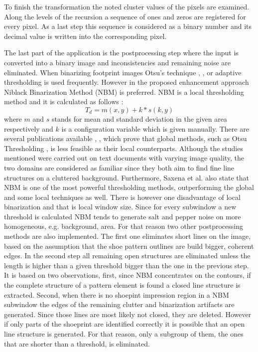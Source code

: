 \documentclass[draft,final]{vutinfth} %
\begin{document}
To finish the transformation the noted cluster values of the pixels are examined.
Along the levels of the recursion a sequence of ones and zeros are registered for every pixel.
As a last step this sequence is considered as a binary number and its decimal value is written into the corresponding pixel.
\par
The last part of the application is the postprocessing step where the input is converted into a binary image and inconsistencies and remaining noise are eliminated.
When binarizing footprint images Otsu's technique \cite{algarni2008novel}, \cite{alizadeh2017automatic}, \cite{wu2019crime} or adaptive thresholding \cite{wang2014automatic} is used frequently.
However in the proposed enhancement approach Niblack Binarization Method (NBM) \cite{niblack1985introduction} is preferred.
NBM is a local thresholding method and it is calculated as follows \cite{saxena2019niblack}:
\[T_d = m(x,y) + k * s(k, y)\]
where $m$ and $s$ stands for mean and standard deviation in the given area respectively and $k$ is a configuration variable which is given manually. 
There are several publications available \cite{som2011application}, \cite{athimethphat2011review}, which prove that global methods, such as Otsu Thresholding \cite{otsu1979threshold}, is less feasible as their local counterparts.
Although the studies mentioned were carried out on text documents with varying image quality, the two domains are considered as familiar since they both aim to find fine line structures on a cluttered background.
Furthermore, Saxena et al. \cite{saxena2019niblack} also state that NBM is one of the most powerful thresholding methods, outperforming the global and some local techniques as well. 
There is however one disadvantage of local binarization and that is local window size.
Since for every subwindow a new threshold is calculated NBM tends to generate salt and pepper noise on more homogeneous, e.g. background, area.
For that reason two other postprocessing methods are also implemented.
The first one eliminates short lines on the image, based on the assumption that the shoe pattern outlines are build bigger, coherent edges.
In the second step all remaining open structures are eliminated unless the length is higher than a given threshold bigger than the one in the previous step.
It is based on two observations, first,  since NBM concentrates on the contours, if the complete structure of a pattern element is found a closed line structure is extracted.
Second, when there is no shoepint impression region in a NBM subwindow the edges of the remaining clutter and binarization artifacts are generated.
Since those lines are most likely not closed, they are deleted.
However  if only parts of the shoeprint are identified correctly it is possible that an open line structure is generated.
For that reason, only a subgroup of them, the ones that are shorter than a threshold, is eliminated.
\end{document}
